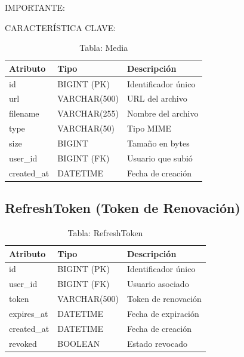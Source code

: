 \documentclass[12pt,a4paper,oneside]{book}
\begin{document}
\begin{alert}{IMPORTANTE:}
\begin{info}{CARACTERÍSTICA CLAVE:}
\begin{table}[ht]
    \centering
    \caption{Tabla: Media}
    \begin{tabular}{@{}lll@{}}
        \toprule
        \textbf{Atributo} & \textbf{Tipo} & \textbf{Descripción} \\
        \midrule
        id & BIGINT (PK) & Identificador único \\
        url & VARCHAR(500) & URL del archivo \\
        filename & VARCHAR(255) & Nombre del archivo \\
        type & VARCHAR(50) & Tipo MIME \\
        size & BIGINT & Tamaño en bytes \\
        user\_id & BIGINT (FK) & Usuario que subió \\
        created\_at & DATETIME & Fecha de creación \\
        \bottomrule
    \end{tabular}
\end{table}

\subsection{RefreshToken (Token de Renovación)}
\label{sec:refreshtoken}

\begin{table}[ht]
    \centering
    \caption{Tabla: RefreshToken}
    \begin{tabular}{@{}lll@{}}
        \toprule
        \textbf{Atributo} & \textbf{Tipo} & \textbf{Descripción} \\
        \midrule
        id & BIGINT (PK) & Identificador único \\
        user\_id & BIGINT (FK) & Usuario asociado \\
        token & VARCHAR(500) & Token de renovación \\
        expires\_at & DATETIME & Fecha de expiración \\
        created\_at & DATETIME & Fecha de creación \\
        revoked & BOOLEAN & Estado revocado \\
        \bottomrule
    \end{tabular}
\end{table}


\end{info}
\end{alert}
\end{document}
